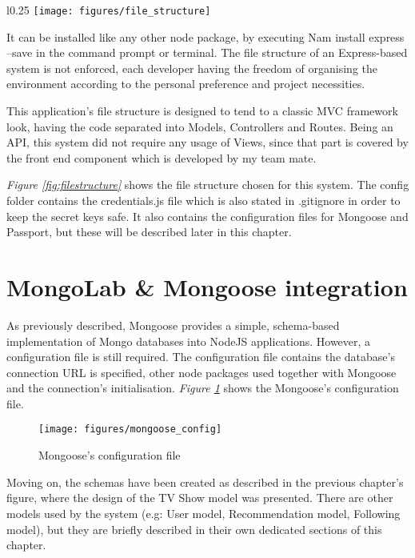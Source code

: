 \begin{wrapfigure}{l}{0.25\textwidth}
\centering
\texttt{[image: figures/file\_structure]}
\caption{Trakt.tv Recommendations \newline Source: https://trakt.tv/}
\vspace{-3em}
\label{fig:filestructure}
\end{wrapfigure}

It can be installed like any other node package, by executing Nam install express --save in the command prompt or terminal. The file structure of an Express-based system is not enforced, each developer having the freedom of organising the environment according to the personal preference and project necessities.

This application's file structure is designed to tend to a classic MVC framework look, having the code separated into Models, Controllers and Routes. Being an API, this system did not require any usage of Views, since that part is covered by the front end component which is developed by my team mate.

\textit{Figure \ref{fig:filestructure}} shows the file structure chosen for this system. The config folder contains the credentials.js file which is also stated in .gitignore in order to keep the secret keys safe. It also contains the configuration files for Mongoose and Passport, but these will be described later in this chapter.

\section{MongoLab \& Mongoose integration}

As previously described, Mongoose provides a simple, schema-based implementation of Mongo databases into NodeJS applications. However, a configuration file is still required. The configuration file contains the database's connection URL is specified, other node packages used together with Mongoose and the connection's initialisation. \textit{Figure \ref{fig:mongooseconfig}} shows the Mongoose's configuration file.

\begin{figure}[h]
\centering
\texttt{[image: figures/mongoose\_config]}
\caption{Mongoose's configuration file}
\label{fig:mongooseconfig}
\end{figure}

Moving on, the schemas have been created as described in the previous chapter's figure, where the design of the TV Show model was presented. There are other models used by the system (e.g: User model, Recommendation model, Following model), but they are briefly described in their own dedicated sections of this chapter.

